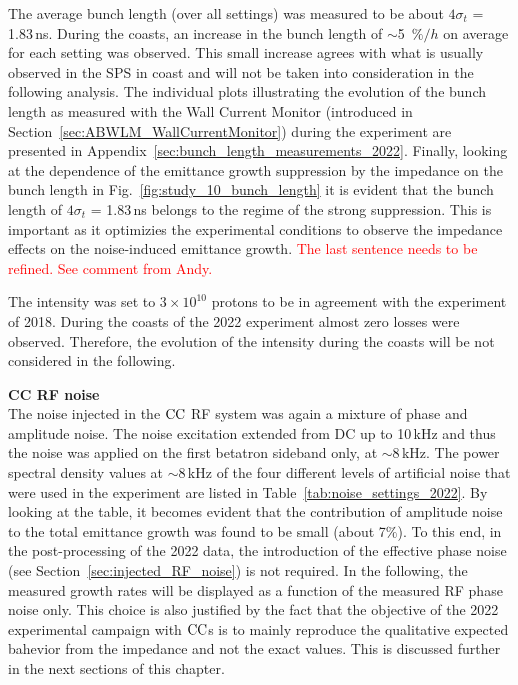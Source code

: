 The average bunch length (over all settings) was measured to be about $4\sigma_t$ = 1.83\,ns. During the coasts, an increase in the bunch length of $\sim$5~$\%/h$ on average for each setting was observed. This small increase agrees with what is usually observed in the SPS in coast and will not be taken into consideration in the following analysis. The individual plots illustrating the evolution of the bunch length as measured with the Wall Current Monitor (introduced in Section~\ref{sec:ABWLM_WallCurrentMonitor}) during the experiment are presented in Appendix~\ref{sec:bunch_length_measurements_2022}. Finally, looking at the dependence of the emittance growth suppression by the impedance on the bunch length in Fig.~\ref{fig:study_10_bunch_length} it is evident that the bunch length of $4\sigma_t$ = 1.83\,ns belongs to the regime of the strong suppression. This is important as it optimizies the experimental conditions to observe the impedance effects on the noise-induced emittance growth. \textcolor{red}{The last sentence needs to be refined. See comment from Andy.}

The intensity was set to $3 \times 10^{10}$ protons to be in agreement with the experiment of 2018. During the coasts of the 2022 experiment almost zero losses were observed. Therefore, the evolution of the intensity during the coasts will be not considered in the following.


\textbf{CC RF noise}\\
The noise injected in the ${\mathrm{CC}}$ RF system was again a mixture of phase and amplitude noise. The noise excitation extended from DC up to 10\,kHz and thus the noise was applied on the first betatron sideband only, at $\sim$8\,kHz. The power spectral density values at $\sim$8\,kHz of the four different levels of artificial noise that were used in the experiment are listed in Table~\ref{tab:noise_settings_2022}. By looking at the table, it becomes evident that the contribution of amplitude noise to the total emittance growth was found to be small (about 7$\%$). To this end, in the post-processing of the 2022 data, the introduction of the effective phase noise (see Section~\ref{sec:injected_RF_noise}) is not required. In the following, the measured growth rates will be displayed as a function of the measured RF phase noise only. This choice is also justified by the fact that the objective of the 2022 experimental campaign with ${\mathrm{CC}}$s is to mainly reproduce the qualitative expected bahevior from the impedance and not the exact values. This is discussed further in the next sections of this chapter.

